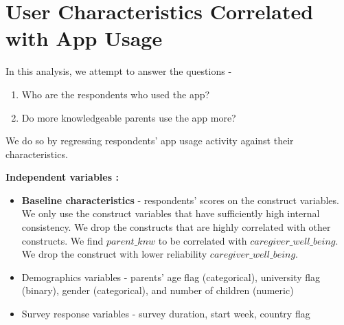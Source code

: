 \message{ !name(bebbo.tex)}\documentclass{article}
\begin{document}
% 
% 
% 

% 
% 
% 









% 
% 
% 

% 
% 
% 


\section{User Characteristics Correlated with App Usage}

In this analysis, we attempt to answer the questions -
\begin{enumerate}
    \item Who are the respondents who used the app?
    \item Do more knowledgeable parents use the app more?
\end{enumerate}

We do so by regressing respondents' app usage activity against their characteristics.
\vspace{1em}

\textbf{Independent variables :}
\begin{itemize}
    \item \textbf{Baseline characteristics} - respondents' scores on the construct variables. We only use the construct variables that have sufficiently high internal consistency. We drop the constructs that are highly correlated with other constructs. We find $parent\_knw$ to be correlated with $caregiver\_well\_being$. We drop the construct with lower reliability $caregiver\_well\_being$.
    \item Demographics variables - parents' age flag (categorical), university flag (binary), gender (categorical), and number of children (numeric)
    \item Survey response variables - survey duration, start week, country flag
\end{itemize}
\end{document}
